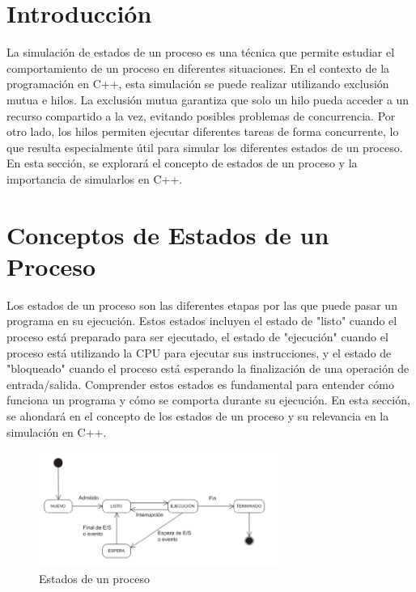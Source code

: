 \documentclass[12pt,a4paper]{article}
\begin{document}

\pagestyle{fancy} \mystyle \newpage %

\section{Introducción}
La simulación de estados de un proceso es una técnica que permite estudiar el comportamiento de un proceso en diferentes situaciones. En el contexto de la programación en C++, esta simulación se puede realizar utilizando exclusión mutua e hilos. La exclusión mutua garantiza que solo un hilo pueda acceder a un recurso compartido a la vez, evitando posibles problemas de concurrencia. Por otro lado, los hilos permiten ejecutar diferentes tareas de forma concurrente, lo que resulta especialmente útil para simular los diferentes estados de un proceso. En esta sección, se explorará el concepto de estados de un proceso y la importancia de simularlos en C++.

\section{Conceptos de Estados de un Proceso}
Los estados de un proceso son las diferentes etapas por las que puede pasar un programa en su ejecución. Estos estados incluyen el estado de "listo" cuando el proceso está preparado para ser ejecutado, el estado de "ejecución" cuando el proceso está utilizando la CPU para ejecutar sus instrucciones, y el estado de "bloqueado" cuando el proceso está esperando la finalización de una operación de entrada/salida. Comprender estos estados es fundamental para entender cómo funciona un programa y cómo se comporta durante su ejecución. En esta sección, se ahondará en el concepto de los estados de un proceso y su relevancia en la simulación en C++.
\begin{figure}[h]
    \centering
    \caption{Estados de un proceso} 
    \includegraphics[width=0.7\textwidth]{images/estados.png}
    
\end{figure}
\end{document}
